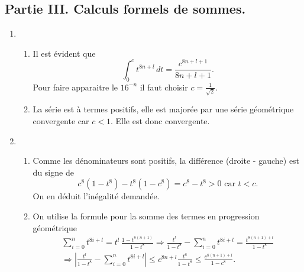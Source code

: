 \subsection*{Partie III. Calculs formels de sommes.}
\begin{enumerate}
 \item 
\begin{enumerate}
 \item Il est évident que
\begin{displaymath}
 \int_{0}^{c}t^{8n+l}\,dt = \frac{c^{8n+l+1}}{8n+l+1}.
\end{displaymath}
Pour faire apparaitre le $16^{-n}$ il faut choisir $c= \frac{1}{\sqrt{2}}$.

 \item La série est à termes positifs, elle est majorée par une série géométrique convergente car $c<1$. Elle est donc convergente.
\end{enumerate}

 \item
\begin{enumerate}
\item Comme les dénominateurs sont positifs, la différence (droite - gauche) est du signe de
\begin{displaymath}
 c^8(1-t^8) - t^8(1-c^8) = c^8 - t^8 >0 \text{ car } t < c.
\end{displaymath}
On en déduit l'inégalité demandée.

 \item On utilise la formule pour la somme des termes en progression géométrique 
\begin{multline*}
 \sum_{i=0}^n t^{8i+l} = t^{l} \, \frac{1 - t^{8(n+1)}}{1-t^8} 
\Rightarrow \frac{t^l}{1-t^8} - \sum_{i=0}^n t^{8i+l}= \frac{t^{8(n+1)+l}}{1-t^8}\\
\Rightarrow
\left| \frac{t^l}{1-t^8} - \sum_{i=0}^n t^{8i+l} \right| 
\leq c^{8n+l} \frac{t^8}{1-t^8} \leq \frac{c^{8(n+1)+l}}{1-c^8}.
\end{multline*}


\end{enumerate}
\end{enumerate}

